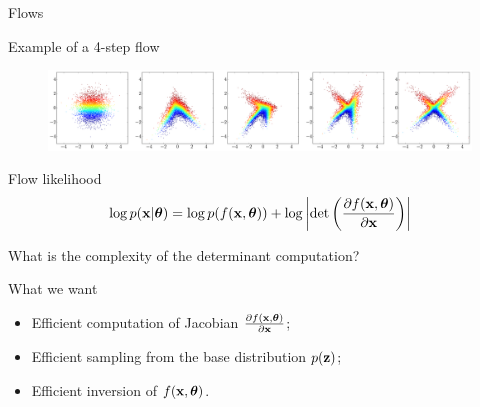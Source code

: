 \begin{frame}{Flows}
	\begin{block}{Example of a 4-step flow}
	\vspace{-0.2cm}
	\begin{figure}
			\includegraphics[width=\linewidth]{figs/flow_4_steps_example.png}
	\end{figure}
	\end{block}
	\vspace{-0.5cm}
	\begin{block}{Flow likelihood}
		\vspace{-0.3cm}
		\[
		\log p(\mathbf{x}|\boldsymbol{\theta}) = \log p(f(\mathbf{x}, \boldsymbol{\theta})) + \log \left|\det \left( \frac{\partial f(\mathbf{x}, \boldsymbol{\theta})}{\partial \mathbf{x}} \right) \right|
		\]
		\vspace{-0.3cm}
	\end{block}
	What is the complexity of the determinant computation?
	\begin{block}{What we want}
		\begin{itemize}
			\item Efficient computation of Jacobian $\frac{\partial f(\mathbf{x}, \boldsymbol{\theta})}{\partial \mathbf{x}}$;
			\item Efficient sampling from the base distribution $p(\mathbf{z})$;
			\item Efficient inversion of $f(\mathbf{x}, \boldsymbol{\theta})$.
		\end{itemize}
	\end{block}
\end{frame}
